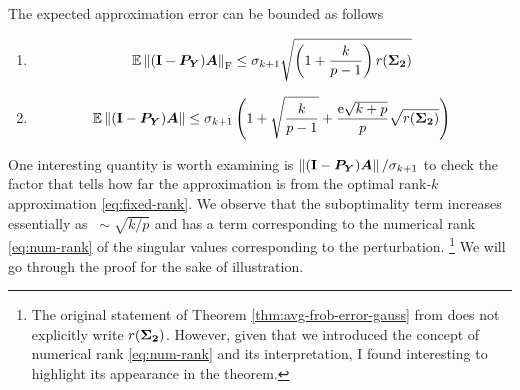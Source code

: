\begin{theorem} \label{thm:avg-frob-error-gauss}
The expected approximation error can be bounded as follows
\begin{enumerate}
  \item
$$
\operatorname{\mathbb{E}} \left\Vert {(\mathbf{I}- \bm{P}_{\bm{Y}}) \bm{A}} \right\Vert_{\mathrm{F}}
    \leq \sigma_{k+1}\sqrt{\left( 1 + \frac{k}{p-1} \right)r(\bm{\Sigma_2})}
$$
\item 
$$
\operatorname{\mathbb{E}} \left\Vert {(\mathbf{I}- \bm{P}_{\bm{Y}}) \bm{A}} \right\Vert
    \leq  \sigma_{k+1}\left(1 + \sqrt{\frac{k}{p-1}}
    +  \frac{\mathrm{e}\sqrt{k+p}}{p}\sqrt{r(\bm{\Sigma_2})}\right)
$$
 \end{enumerate}
\end{theorem}
One interesting quantity is worth examining is
$\left\Vert {(\mathbf{I}- \bm{P}_{\bm{Y}}) \bm{A}} \right\Vert/\sigma_{k+1}$ to check
the factor that tells how far the
approximation is from the optimal rank-$k$ approximation \ref{eq:fixed-rank}.
We observe that the suboptimality term increases
essentially as $~\sim\sqrt{k/p}$ and has a term corresponding to the 
numerical rank \ref{eq:num-rank} of the singular values corresponding
to the perturbation.
\footnote{The original statement of Theorem \ref{thm:avg-frob-error-gauss}
from \cite{halko2011finding} does not explicitly write $r(\bm{\Sigma_2})$.
However, given that we introduced the concept of numerical rank 
\ref{eq:num-rank} and its interpretation, I found interesting to highlight its
appearance in the theorem.}
We will go through the proof for the sake of illustration.
